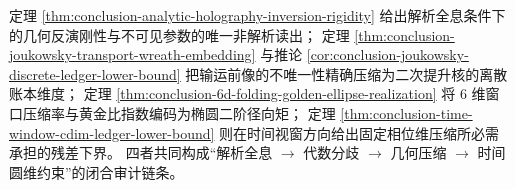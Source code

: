 \begin{remark}\label{rem:conclusion-holography-uplift-ellipse-time-closed-loop}
定理 \ref{thm:conclusion-analytic-holography-inversion-rigidity} 给出解析全息条件下的几何反演刚性与不可见参数的唯一非解析读出；
定理 \ref{thm:conclusion-joukowsky-transport-wreath-embedding} 与推论 \ref{cor:conclusion-joukowsky-discrete-ledger-lower-bound}
把输运前像的不唯一性精确压缩为二次提升核的离散账本维度；
定理 \ref{thm:conclusion-6d-folding-golden-ellipse-realization}
将 \(6\) 维窗口压缩率与黄金比指数编码为椭圆二阶径向矩；
定理 \ref{thm:conclusion-time-window-cdim-ledger-lower-bound}
则在时间视窗方向给出固定相位维压缩所必需承担的残差下界。
四者共同构成“解析全息 \(\to\) 代数分歧 \(\to\) 几何压缩 \(\to\) 时间圆维约束”的闭合审计链条。
\end{remark}
